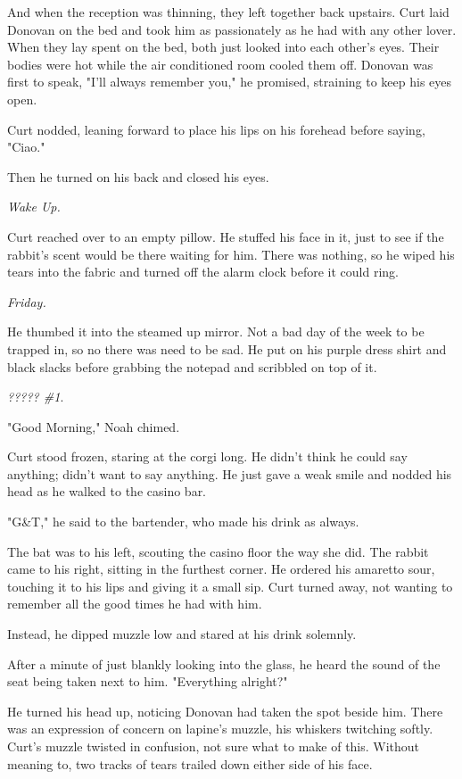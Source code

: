 And when the reception was thinning, they left together back upstairs. Curt laid Donovan on the bed and took him as passionately as he had with any other lover. When they lay spent on the bed, both just looked into each other's eyes. Their bodies were hot while the air conditioned room cooled them off. Donovan was first to speak, "I'll always remember you," he promised, straining to keep his eyes open.

Curt nodded, leaning forward to place his lips on his forehead before saying, "Ciao."

Then he turned on his back and closed his eyes.

\emph{Wake Up.}

Curt reached over to an empty pillow. He stuffed his face in it, just to see if the rabbit's scent would be there waiting for him. There was nothing, so he wiped his tears into the fabric and turned off the alarm clock before it could ring.

\emph{Friday.}

He thumbed it into the steamed up mirror. Not a bad day of the week to be trapped in, so no there was need to be sad. He put on his purple dress shirt and black slacks before grabbing the notepad and scribbled on top of it.

\emph{????? \#1}.

"Good Morning," Noah chimed.

Curt stood frozen, staring at the corgi long. He didn't think he could say anything; didn't want to say anything. He just gave a weak smile and nodded his head as he walked to the casino bar.

"G\&T," he said to the bartender, who made his drink as always.

The bat was to his left, scouting the casino floor the way she did. The rabbit came to his right, sitting in the furthest corner. He ordered his amaretto sour, touching it to his lips and giving it a small sip. Curt turned away, not wanting to remember all the good times he had with him.

Instead, he dipped muzzle low and stared at his drink solemnly.

After a minute of just blankly looking into the glass, he heard the sound of the seat being taken next to him. "Everything alright?"

He turned his head up, noticing Donovan had taken the spot beside him. There was an expression of concern on lapine's muzzle, his whiskers twitching softly. Curt's muzzle twisted in confusion, not sure what to make of this. Without meaning to, two tracks of tears trailed down either side of his face.

